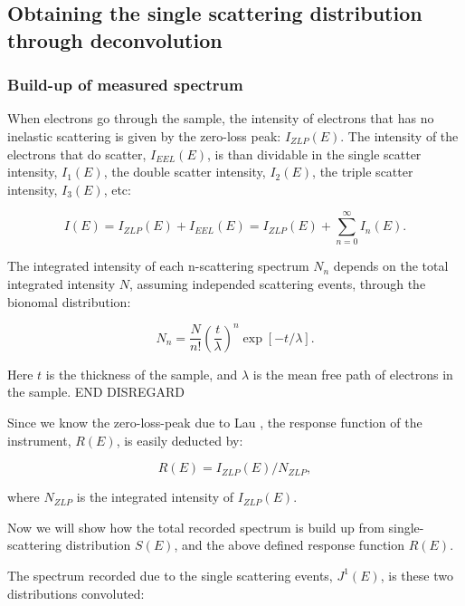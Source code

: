 \subsection{Obtaining the single scattering distribution through deconvolution} \label{sect_deconv}

\subsubsection{Build-up of measured spectrum}
When electrons go through the sample, the intensity of electrons that has no inelastic scattering is given by the zero-loss peak: $I_{ZLP}(E)$. The intensity of the electrons that do scatter, $I_{EEL}(E)$, is than dividable in the single scatter intensity, $I_1(E)$, the double scatter intensity, $I_2(E)$, the triple scatter intensity, $I_3(E)$, etc:

\begin{equation}\label{eq_I}
    I(E) = I_{ZLP}(E) + I_{EEL}(E) = I_{ZLP}(E) + \sum_{n=0}^\infty I_n(E).
\end{equation}


The integrated intensity of each n-scattering spectrum $N_n$  depends on the total integrated intensity $N$, assuming independed scattering events, through the bionomal distribution:

\begin{equation}\label{eq_N_n}
    N_n =  \frac{N}{n!} \left(\frac{t}{\lambda}\right)^n \exp{[-t/\lambda]} .
\end{equation}

Here $t$ is the thickness of the sample, and $\lambda$ is the mean free path of electrons in the sample. 
END DISREGARD

Since we know the zero-loss-peak due to Lau \cite{lau}, the response function of the instrument, $R(E)$, is easily deducted by:

\begin{equation}
    R(E) = I_{ZLP}(E)/N_{ZLP},
\end{equation}

where $N_{ZLP}$ is the integrated intensity of $I_{ZLP}(E)$. 


Now we will show how the total recorded spectrum is build up from single-scattering distribution $S(E)$, and the above defined response function $R(E)$. 


The spectrum recorded due to the single scattering events, $J^1(E)$, is these two distributions convoluted:

